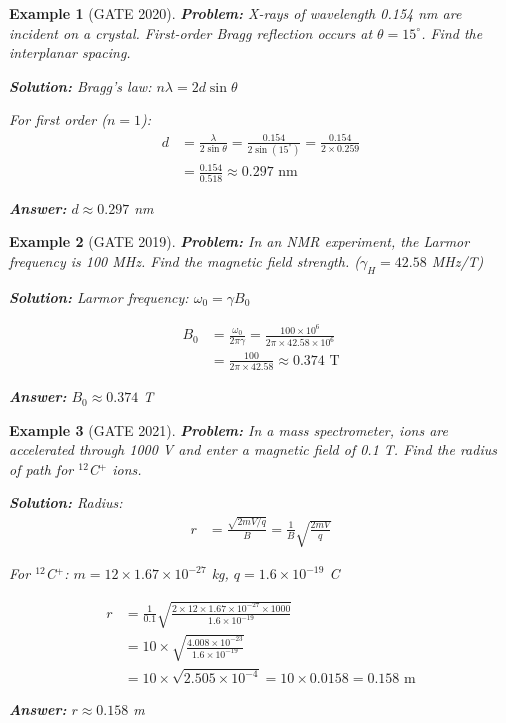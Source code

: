 \documentclass[12pt,a4paper]{article}
\newtheorem{example}{Example}[section]
\newcommand{\ans}[1]{\textcolor{red!70!black}{\textbf{Answer:} #1}}
\newcommand{\sol}{\textcolor{blue!70!black}{\textbf{Solution:}}}
\begin{document}
\begin{example}[GATE 2020]
\textbf{Problem:} X-rays of wavelength 0.154 nm are incident on a crystal. First-order Bragg reflection occurs at $\theta = 15^\circ$. Find the interplanar spacing.

\sol
Bragg's law: $n\lambda = 2d\sin\theta$

For first order ($n=1$):
\begin{align}
d &= \frac{\lambda}{2\sin\theta} = \frac{0.154}{2\sin(15^\circ)} = \frac{0.154}{2 \times 0.259}\\
&= \frac{0.154}{0.518} \approx 0.297 \text{ nm}
\end{align}

\ans{$d \approx 0.297$ nm}
\end{example}

\begin{example}[GATE 2019]
\textbf{Problem:} In an NMR experiment, the Larmor frequency is 100 MHz. Find the magnetic field strength. ($\gamma_H = 42.58$ MHz/T)

\sol
Larmor frequency: $\omega_0 = \gamma B_0$

\begin{align}
B_0 &= \frac{\omega_0}{2\pi\gamma} = \frac{100 \times 10^6}{2\pi \times 42.58 \times 10^6}\\
&= \frac{100}{2\pi \times 42.58} \approx 0.374 \text{ T}
\end{align}

\ans{$B_0 \approx 0.374$ T}
\end{example}

\begin{example}[GATE 2021]
\textbf{Problem:} In a mass spectrometer, ions are accelerated through 1000 V and enter a magnetic field of 0.1 T. Find the radius of path for $^{12}$C$^+$ ions.

\sol
Radius:
\begin{align}
r &= \frac{\sqrt{2mV/q}}{B} = \frac{1}{B}\sqrt{\frac{2mV}{q}}
\end{align}

For $^{12}$C$^+$: $m = 12 \times 1.67 \times 10^{-27}$ kg, $q = 1.6 \times 10^{-19}$ C

\begin{align}
r &= \frac{1}{0.1}\sqrt{\frac{2 \times 12 \times 1.67 \times 10^{-27} \times 1000}{1.6 \times 10^{-19}}}\\
&= 10 \times \sqrt{\frac{4.008 \times 10^{-23}}{1.6 \times 10^{-19}}}\\
&= 10 \times \sqrt{2.505 \times 10^{-4}} = 10 \times 0.0158 = 0.158 \text{ m}
\end{align}

\ans{$r \approx 0.158$ m}
\end{example}
\end{document}
